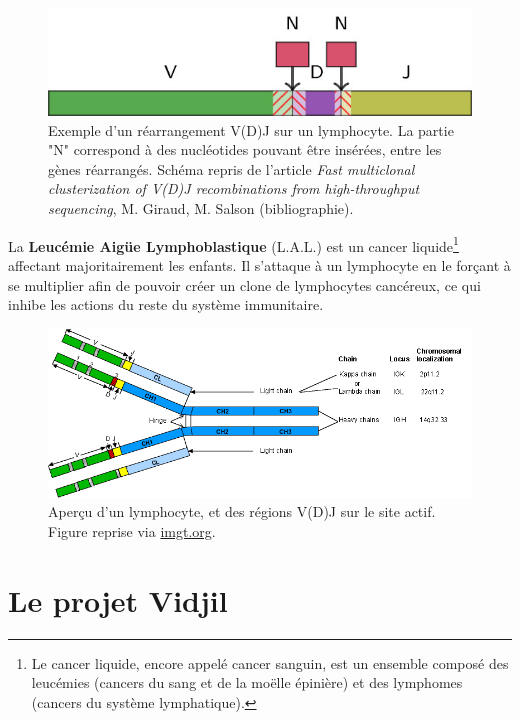 \documentclass[pdftex,12pt,a4paper]{report}
\begin{document}
\begin{spacing}{1.2}
\begin{figure}[H]
\begin{center}
	\includegraphics[scale=10]{img/vdj-recombination.jpg}
\end{center}
\caption{Exemple d'un réarrangement V(D)J sur un lymphocyte. La partie "N" correspond à des nucléotides pouvant être insérées, entre les gènes réarrangés. Schéma repris de l'article \textit{Fast multiclonal clusterization of V(D)J recombinations from high-throughput sequencing}, M. Giraud, M. Salson (bibliographie).}
\label{fig:recombination}
\end{figure}

La \textbf{Leucémie Aigüe Lymphoblastique} (L.A.L.) est un cancer liquide\footnote{Le cancer liquide, encore appelé cancer sanguin, est un ensemble composé des leucémies (cancers du sang et de la moëlle épinière) et des lymphomes (cancers du système lymphatique).} affectant majoritairement les enfants. Il s'attaque à un lymphocyte en le forçant à se multiplier afin de pouvoir créer un clone de lymphocytes cancéreux, ce qui inhibe les actions du reste du système immunitaire.

\begin{figure}[H]
\begin{center}
	\includegraphics[scale=0.45]{img/angfig1.png}
\end{center}
\caption{Aperçu d'un lymphocyte, et des régions V(D)J sur le site actif. Figure reprise via \url{imgt.org}.}
\label{fig:lymphocyte}
\end{figure}

\section{Le projet Vidjil}


\end{spacing}
\end{document}
